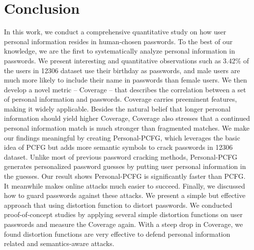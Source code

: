 \section{Conclusion}
In this work, we conduct a comprehensive quantitative study on how user personal information resides in human-chosen passwords. To the best of our knowledge, we are the first to systematically analyze personal information in passwords. We present interesting and quantitative observations such as 3.42\% of the users in 12306 dataset use their birthday as passwords, and male users are much more likely to include their name in passwords than female users. We then develop a novel metric -- Coverage -- that describes the correlation between a set of personal information and passwords. Coverage carries preeminent features, making it widely applicable. Besides the natural belief that longer personal information should yield higher Coverage, Coverage also stresses that a continued personal information match is much stronger than fragmented matches. We make our findings meaningful by creating Personal-PCFG, which leverages the basic idea of PCFG but adds more semantic symbols to crack passwords in 12306 dataset. Unlike most of previous password cracking methods, Personal-PCFG generates personalized password guesses by putting user personal information in the guesses. Our result shows Personal-PCFG is significantly faster than PCFG. It meanwhile makes online attacks much easier to succeed. Finally, we discussed how to guard passwords against these attacks. We present a simple but effective approach that using distortion function to distort passwords. We conducted proof-of-concept studies by applying several simple distortion functions on user passwords and measure the Coverage again. With a steep drop in Coverage, we found distortion functions are very effective to defend personal information related and semantics-aware attacks.